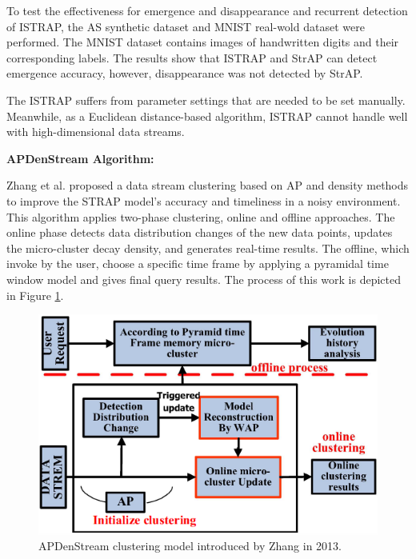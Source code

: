 
To test the effectiveness for emergence and disappearance and recurrent detection of ISTRAP, the AS synthetic dataset and MNIST real-wold dataset were performed.
The MNIST dataset contains images of handwritten digits and their corresponding labels.
The results show that ISTRAP and StrAP can detect emergence accuracy, however, disappearance was not detected by StrAP.

The ISTRAP suffers from parameter settings that are needed to be set manually. Meanwhile, as a Euclidean
distance-based algorithm, ISTRAP cannot handle well with high-dimensional data streams. 




\textbf{APDenStream Algorithm:}

Zhang et al. \cite{zhang2013online} proposed a data stream clustering based on AP and density methods to improve the STRAP model's accuracy and timeliness in a noisy environment. This algorithm applies two-phase clustering, online and offline approaches. The online phase detects data distribution changes of the new data points, updates the micro-cluster decay density, and generates real-time results. The offline, which invoke by the user, choose a specific time frame by applying a pyramidal time window model and gives final query results. The process of this work is depicted in Figure \ref{APden}. 


\begin{figure}[h]
\centering
\includegraphics[width = 10 cm]{image/Chapters/Chapter3/APDenstream.PNG}
\caption{APDenStream clustering model introduced by Zhang in 2013. }
\label{APden}
\end{figure}


